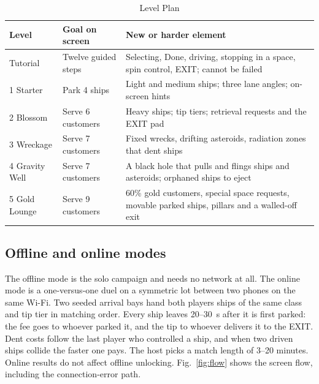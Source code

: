 \documentclass[conference]{IEEEtran}
\begin{document}
\begin{table}[t]
\caption{Level Plan}
\label{tab:levels}
\centering
\footnotesize
\begin{tabular}{@{}L{1.3cm}L{1.6cm}L{4.6cm}@{}}
\toprule
Level & Goal on screen & New or harder element \\
\midrule
Tutorial & Twelve guided steps & Selecting, Done, driving, stopping in a space, spin control, EXIT; cannot be failed \\
1 Starter & Park 4 ships & Light and medium ships; three lane angles; on-screen hints \\
2 Blossom & Serve 6 customers & Heavy ships; tip tiers; retrieval requests and the EXIT pad \\
3 Wreckage & Serve 7 customers & Fixed wrecks, drifting asteroids, radiation zones that dent ships \\
4 Gravity Well & Serve 7 customers & A black hole that pulls and flings ships and asteroids; orphaned ships to eject \\
5 Gold Lounge & Serve 9 customers & 60\% gold customers, special space requests, movable parked ships, pillars and a walled-off exit \\
\bottomrule
\end{tabular}
\end{table}

\subsection{Offline and online modes}
The offline mode is the solo campaign and needs no network at all. The online mode is a one-versus-one duel on a symmetric lot between two phones on the same Wi-Fi. Two seeded arrival bays hand both players ships of the same class and tip tier in matching order. Every ship leaves 20--30~s after it is first parked: the fee goes to whoever parked it, and the tip to whoever delivers it to the EXIT. Dent costs follow the last player who controlled a ship, and when two driven ships collide the faster one pays. The host picks a match length of 3--20 minutes. Online results do not affect offline unlocking. Fig.~\ref{fig:flow} shows the screen flow, including the connection-error path.
\end{document}
